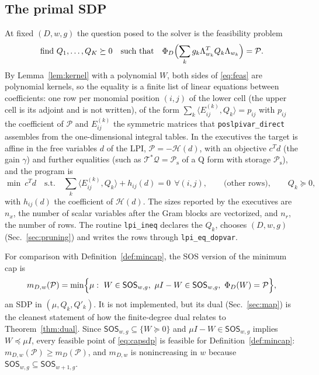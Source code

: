 \documentclass[12pt]{article}
\newcommand{\mcl}[1]{\mathcal{#1}}
\newcommand{\mrm}[1]{\mathrm{#1}}
\newcommand{\code}[1]{\texttt{#1}}
\newcommand{\SOS}{\mathsf{SOS}}
\theoremstyle{plain}
\theoremstyle{definition}
\theoremstyle{remark}
\begin{document}
\subsection{The primal SDP}\label{sec:primalsdp}

At fixed $(D,w,g)$ the question posed to the solver is the feasibility problem
\begin{equation}\label{eq:feas}
\text{find }Q_1,\dots,Q_K\succeq0\quad\text{such that}\quad\Phi_D\Bigl(\sum_kg_k\Lambda_{w_k}^TQ_k\Lambda_{w_k}\Bigr)=\mcl P .
\end{equation}
By Lemma~\ref{lem:kernel} with a polynomial $W$, both sides of \eqref{eq:feas} are polynomial kernels, so the equality is a finite list of linear equations between coefficients: one row per monomial position $(i,j)$ of the lower cell (the upper cell is its adjoint and is not written), of the form $\sum_k\langle E^{(k)}_{ij},Q_k\rangle=p_{ij}$ with $p_{ij}$ the coefficient of $\mcl P$ and $E^{(k)}_{ij}$ the symmetric matrices that \code{poslpivar\_direct} assembles from the one-dimensional integral tables. In the executives the target is affine in the free variables $d$ of the LPI, $\mcl P=-\mcl H(d)$, with an objective $c^Td$ (the gain $\gamma$) and further equalities (such as $\mcl T^*\mcl Q=\mcl P_{\mrm{s}}$ of a Q form with storage $\mcl P_{\mrm s}$), and the program is
\begin{equation}\label{eq:sdp}
\min\ c^Td\quad\text{s.t.}\quad\sum_k\langle E^{(k)}_{ij},Q_k\rangle+h_{ij}(d)=0\ \ \forall(i,j),\qquad\text{(other rows)},\qquad Q_k\succeq0,
\end{equation}
with $h_{ij}(d)$ the coefficient of $\mcl H(d)$. The sizes reported by the executives are $n_x$, the number of scalar variables after the Gram blocks are vectorized, and $n_r$, the number of rows. The routine \code{lpi\_ineq} declares the $Q_k$, chooses $(D,w,g)$ (Sec.~\ref{sec:pruning}) and writes the rows through \code{lpi\_eq\_dopvar}.

For comparison with Definition~\ref{def:mincap}, the SOS version of the minimum cap is
\begin{equation}\label{eq:capsdp}
m_{D,w}(\mcl P)=\min\Bigl\{\mu:\ W\in\SOS_{w,g},\ \mu I-W\in\SOS_{w,g},\ \Phi_D(W)=\mcl P\Bigr\},
\end{equation}
an SDP in $(\mu,Q_k,Q'_k)$. It is not implemented, but its dual (Sec.~\ref{sec:map}) is the cleanest statement of how the finite-degree dual relates to Theorem~\ref{thm:dual}. Since $\SOS_{w,g}\subseteq\{W\succeq0\}$ and $\mu I-W\in\SOS_{w,g}$ implies $W\preceq\mu I$, every feasible point of \eqref{eq:capsdp} is feasible for Definition~\ref{def:mincap}: $m_{D,w}(\mcl P)\ge m_D(\mcl P)$, and $m_{D,w}$ is nonincreasing in $w$ because $\SOS_{w,g}\subseteq\SOS_{w+1,g}$.
\end{document}
